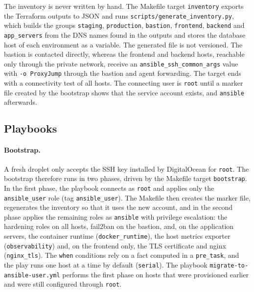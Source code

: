 The inventory is never written by hand. The Makefile target \texttt{inventory} exports the Terraform outputs to JSON and runs \texttt{scripts/generate\_inventory.py}, which builds the groups \texttt{staging}, \texttt{production}, \texttt{bastion}, \texttt{frontend}, \texttt{backend} and \texttt{app\_servers} from the DNS names found in the outputs and stores the database host of each environment as a variable. The generated file is not versioned. The bastion is contacted directly, whereas the frontend and backend hosts, reachable only through the private network, receive an \texttt{ansible\_ssh\_common\_args} value with \texttt{-o ProxyJump} through the bastion and agent forwarding. The target ends with a connectivity test of all hosts. The connecting user is \texttt{root} until a marker file created by the bootstrap shows that the service account exists, and \texttt{ansible} afterwards.


\subsection{Playbooks}

\paragraph{Bootstrap.} A fresh droplet only accepts the SSH key installed by DigitalOcean for \texttt{root}. The bootstrap therefore runs in two phases, driven by the Makefile target \texttt{bootstrap}. In the first phase, the playbook connects as \texttt{root} and applies only the \texttt{ansible\_user} role (tag \texttt{ansible\_user}). The Makefile then creates the marker file, regenerates the inventory so that it uses the new account, and in the second phase applies the remaining roles as \texttt{ansible} with privilege escalation: the hardening roles on all hosts, fail2ban on the bastion, and, on the application servers, the container runtime (\texttt{docker\_runtime}), the host metrics exporter (\texttt{observability}) and, on the frontend only, the TLS certificate and nginx (\texttt{nginx\_tls}). The \texttt{when} conditions rely on a fact computed in a \texttt{pre\_task}, and the play runs one host at a time by default (\texttt{serial}). The playbook \texttt{migrate-to-ansible-user.yml} performs the first phase on hosts that were provisioned earlier and were still configured through \texttt{root}.


